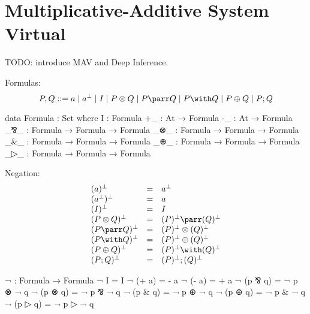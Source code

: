 \begin{comment}
\begin{code}
module mav-syntax (At : Set) where
\end{code}
\end{comment}
\section{Multiplicative-Additive System Virtual}\label{sec:mav-syntax}

TODO: introduce MAV and Deep Inference.

Formulas:
\begin{displaymath}
  P, Q ::= a \mid a^\perp \mid I \mid P \otimes Q \mid P \parr Q \mid P \with Q \mid P \oplus Q \mid P; Q
\end{displaymath}

\begin{code}
data Formula : Set where
  I    : Formula
  +_   : At → Formula
  -_   : At → Formula
  _⅋_  : Formula → Formula → Formula
  _⊗_  : Formula → Formula → Formula
  _&_  : Formula → Formula → Formula
  _⊕_  : Formula → Formula → Formula
  _▷_  : Formula → Formula → Formula
\end{code}

Negation:
\begin{displaymath}
  \begin{array}{lcl}
    (a)^\perp           & = & a^\perp                     \\
    (a^\perp)^\perp     & = & a                           \\
    (I)^\perp           & = & I                           \\
    (P \otimes Q)^\perp & = & (P)^\perp \parr   (Q)^\perp \\
    (P \parr   Q)^\perp & = & (P)^\perp \otimes (Q)^\perp \\
    (P \with   Q)^\perp & = & (P)^\perp \oplus  (Q)^\perp \\
    (P \oplus  Q)^\perp & = & (P)^\perp \with   (Q)^\perp \\
    (P ; Q)^\perp       & = & (P)^\perp ; (Q)^\perp
  \end{array}
\end{displaymath}
\begin{code}
¬ : Formula → Formula
¬ I        = I
¬ (+ a)    = - a
¬ (- a)    = + a
¬ (p ⅋ q)  = ¬ p ⊗ ¬ q
¬ (p ⊗ q)  = ¬ p ⅋ ¬ q
¬ (p & q)  = ¬ p ⊕ ¬ q
¬ (p ⊕ q)  = ¬ p & ¬ q
¬ (p ▷ q)  = ¬ p ▷ ¬ q
\end{code}
